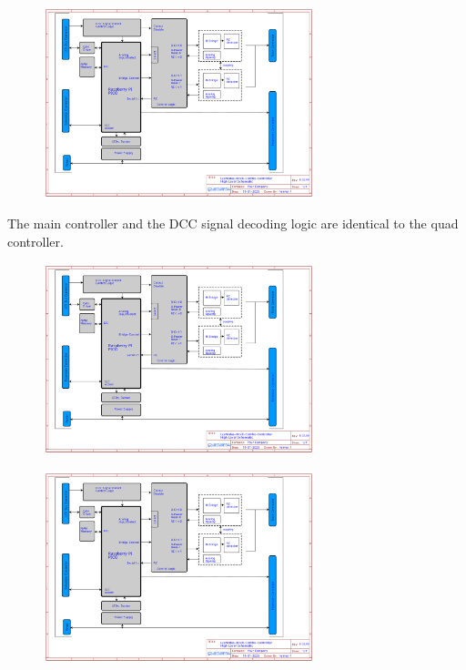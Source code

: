 \begin{figure}[htbp]
    \centering
    \includegraphics[page=1, width=0.7\textwidth]{./Schematics/Schematic_LcsNodes-Block-Combo-Controller.pdf}
\end{figure}
\FloatBarrier

The main controller and the DCC signal decoding logic are identical to the quad controller.

\begin{figure}[htbp]
    \centering
    \includegraphics[page=2, width=0.7\textwidth]{./Schematics/Schematic_LcsNodes-Block-Combo-Controller.pdf}
\end{figure}
\FloatBarrier

\begin{figure}[htbp]
    \centering
    \includegraphics[page=3, width=0.7\textwidth]{./Schematics/Schematic_LcsNodes-Block-Combo-Controller.pdf}
\end{figure}
\FloatBarrier

